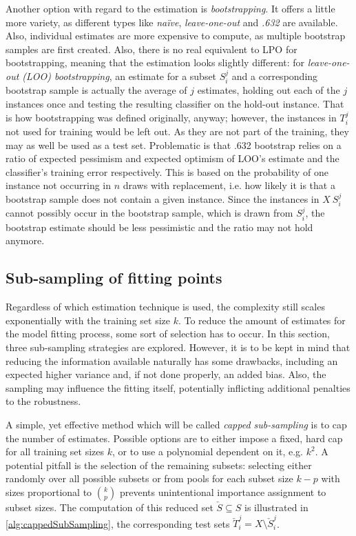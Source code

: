 Another option with regard to the estimation is \textit{bootstrapping}. It offers a little more variety, as different types like \textit{na\"{i}ve}, \textit{leave-one-out} and \textit{.632} are available. Also, individual estimates are more expensive to compute, as multiple bootstrap samples are first created. Also, there is no real equivalent to LPO for bootstrapping, meaning that the estimation looks slightly different: for \textit{leave-one-out (LOO) bootstrapping}, an estimate for a subset $S^j_i$ and a corresponding bootstrap sample is actually the average of $j$ estimates, holding out each of the $j$ instances once and testing the resulting classifier on the hold-out instance. That is how bootstrapping was defined originally, anyway; however, the instances in $T^j_i$ not used for training would be left out. As they are not part of the training, they may as well be used as a test set. Problematic is that .632 bootstrap relies on a ratio of expected pessimism and expected optimism of LOO's estimate and the classifier's training error respectively. This is based on the probability of one instance not occurring in $n$ draws with replacement, i.e. how likely it is that a bootstrap sample does not contain a given instance. Since the instances in $X \ S^j_i$ cannot possibly occur in the bootstrap sample, which is drawn from $S^j_i$, the bootstrap estimate should be less pessimistic and the ratio may not hold anymore.

\subsection{Sub-sampling of fitting points}
Regardless of which estimation technique is used, the complexity still scales exponentially with the training set size $k$. To reduce the amount of estimates for the model fitting process, some sort of selection has to occur. In this section, three sub-sampling strategies are explored. However, it is to be kept in mind that reducing the information available naturally has some drawbacks, including an expected higher variance and, if not done properly, an added bias. Also, the sampling may influence the fitting itself, potentially inflicting additional penalties to the robustness.

A simple, yet effective method which will be called \textit{capped sub-sampling} is to cap the number of estimates. Possible options are to either impose a fixed, hard cap for all training set sizes $k$, or to use a polynomial dependent on it, e.g. $k^2$. A potential pitfall is the selection of the remaining subsets: selecting either randomly over all possible subsets or from pools for each subset size $k-p$ with sizes proportional to $k \choose p$ prevents unintentional importance assignment to subset sizes. The computation of this reduced set $\check{S} \subseteq S$ is illustrated in \ref{alg:cappedSubSampling}, the corresponding test sets $\check{T}^j_i = X \setminus \check{S}^j_i$.

